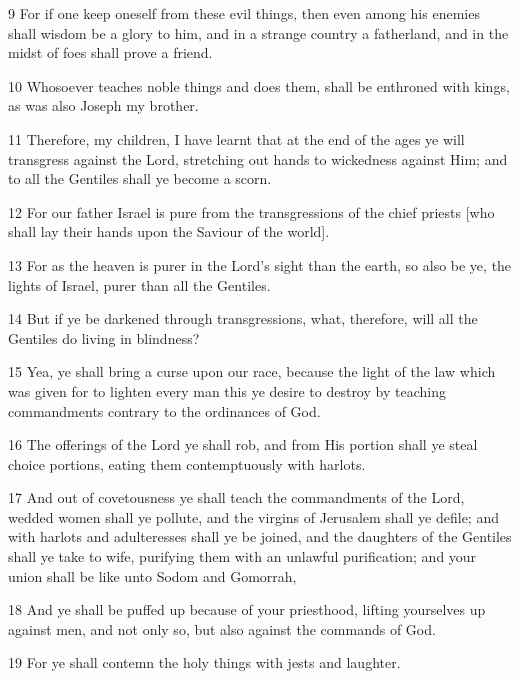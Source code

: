 \par 9 For if one keep oneself from these evil things, then even among his enemies shall wisdom be a glory to him, and in a strange country a fatherland, and in the midst of foes shall prove a friend.

\par 10 Whosoever teaches noble things and does them, shall be enthroned with kings, as was also Joseph my brother.

\par 11 Therefore, my children, I have learnt that at the end of the ages ye will transgress against the Lord, stretching out hands to wickedness against Him; and to all the Gentiles shall ye become a scorn.

\par 12 For our father Israel is pure from the transgressions of the chief priests [who shall lay their hands upon the Saviour of the world].

\par 13 For as the heaven is purer in the Lord's sight than the earth, so also be ye, the lights of Israel, purer than all the Gentiles.

\par 14 But if ye be darkened through transgressions, what, therefore, will all the Gentiles do living in blindness?

\par 15 Yea, ye shall bring a curse upon our race, because the light of the law which was given for to lighten every man this ye desire to destroy by teaching commandments contrary to the ordinances of God.

\par 16 The offerings of the Lord ye shall rob, and from His portion shall ye steal choice portions, eating them contemptuously with harlots.

\par 17 And out of covetousness ye shall teach the commandments of the Lord, wedded women shall ye pollute, and the virgins of Jerusalem shall ye defile; and with harlots and adulteresses shall ye be joined, and the daughters of the Gentiles shall ye take to wife, purifying them with an unlawful purification; and your union shall be like unto Sodom and Gomorrah,

\par 18 And ye shall be puffed up because of your priesthood, lifting yourselves up against men, and not only so, but also against the commands of God.

\par 19 For ye shall contemn the holy things with jests and laughter.

